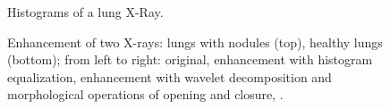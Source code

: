 \documentclass{article}
\begin{document}
\begin{figure}[ht]
	\centering
	\caption{Histograms of a lung X-Ray.} \label{hist_contrast}
\end{figure}

\begin{figure}[ht]
	\centering
	\caption{Enhancement of two X-rays: lungs with nodules (top), healthy lungs (bottom); from left to right: original, enhancement with histogram equalization, enhancement with wavelet decomposition and morphological operations of opening and closure, \citep{aidoo2019chest}.} \label{enhancement}
\end{figure}
\end{document}
